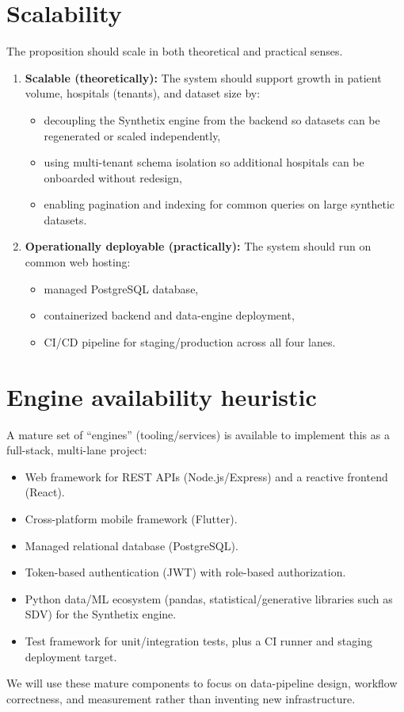 \documentclass[11pt]{article}
\begin{document}
\section{Scalability}
The proposition should scale in both theoretical and practical senses.

\begin{enumerate}
    \item \textbf{Scalable (theoretically):} The system should support growth in patient volume, hospitals (tenants), and dataset size by:
    \begin{itemize}
        \item decoupling the Synthetix engine from the backend so datasets can be regenerated or scaled independently,
        \item using multi-tenant schema isolation so additional hospitals can be onboarded without redesign,
        \item enabling pagination and indexing for common queries on large synthetic datasets.
    \end{itemize}
    \item \textbf{Operationally deployable (practically):} The system should run on common web hosting:
    \begin{itemize}
        \item managed PostgreSQL database,
        \item containerized backend and data-engine deployment,
        \item CI/CD pipeline for staging/production across all four lanes.
    \end{itemize}
\end{enumerate}

\section{Engine availability heuristic}
A mature set of ``engines'' (tooling/services) is available to implement this as a full-stack, multi-lane project:
\begin{itemize}
    \item Web framework for REST APIs (Node.js/Express) and a reactive frontend (React).
    \item Cross-platform mobile framework (Flutter).
    \item Managed relational database (PostgreSQL).
    \item Token-based authentication (JWT) with role-based authorization.
    \item Python data/ML ecosystem (pandas, statistical/generative libraries such as SDV) for the Synthetix engine.
    \item Test framework for unit/integration tests, plus a CI runner and staging deployment target.
\end{itemize}
We will use these mature components to focus on data-pipeline design, workflow correctness, and measurement rather than inventing new infrastructure.
\end{document}
